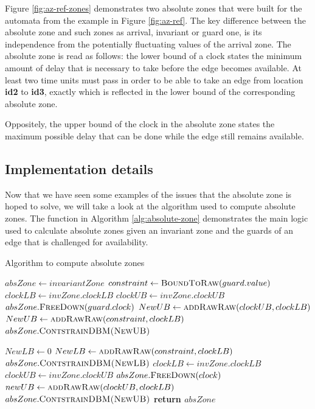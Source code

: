 Figure \ref{fig:az-ref-zones} demonstrates two absolute zones that were built for the automata from the example in Figure \ref{fig:az-ref}. The key difference between the absolute zone and such zones as arrival, invariant or guard one, is its independence from the potentially fluctuating values of the arrival zone. The absolute zone is read as follows: the lower bound of a clock states the minimum amount of delay that is necessary to take before the edge becomes available. At least two time units must pass in order to be able to take an edge from location \textbf{id2} to \textbf{id3}, exactly which is reflected in the lower bound of the corresponding absolute zone. 

Oppositely, the upper bound of the clock in the absolute zone states the maximum possible delay that can be done while the edge still remains available. 


\subsection{Implementation details}
Now that we have seen some examples of the issues that the absolute zone is hoped to solve, we will take a look at the algorithm used to compute absolute zones. The function in Algorithm \ref{alg:absolute-zone} demonstrates the main logic used to calculate absolute zones given an invariant zone and the guards of an edge that is challenged for availability.

\begin{algorithm}
\caption{Algorithm to compute absolute zones}
\label{alg:absolute-zone}
\begin{algorithmic}[1]
\State $absZone \gets invariantZone$
\State $constraint \gets \textsc{BoundToRaw}(guard.value)$
\State $clockLB \gets invZone.clockLB$
\State $clockUB \gets invZone.clockUB$
\State $absZone.\textsc{FreeDown}(guard.clock)$
\EndIf
	        \State $NewUB \gets \textsc{addRawRaw}(clockUB, clockLB)$
	    \Else
	        \State $NewUB \gets \textsc{addRawRaw}(constraint, clockLB)$
	    \EndIf
	    \State $absZone.\textsc{ContstrainDBM(NewUB)}$
	\EndIf
		
	        \State $NewLB \gets 0$
	    \Else
	        \State $NewLB \gets \textsc{addRawRaw}(constraint, clockLB)$
	    \EndIf
	     \State $absZone.\textsc{ContstrainDBM(NewLB)}$
	\EndIf
\EndFor
{}
\State $clockLB \gets invZone.clockLB$
\State $clockUB \gets invZone.clockUB$
    \State $absZone.\textsc{FreeDown}(clock)$
\EndIf
{}
\State $newUB \gets \textsc{addRawRaw}(clockUB, clockLB)$
\EndIf
\State $absZone.\textsc{ContstrainDBM(NewUB)}$
\EndFor
\State
\State \textbf{return $absZone$}	
\EndFunction
\end{algorithmic}
\end{algorithm}

